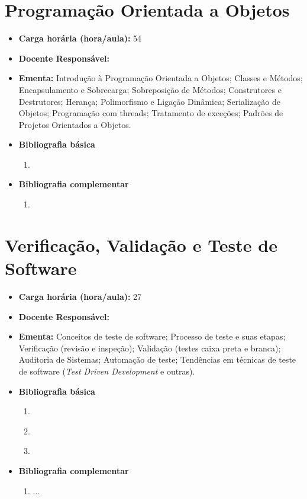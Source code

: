 \documentclass[11pt,fleqn]{book} %
\begin{document}

\newpage
\section{Programação Orientada a Objetos}\label{disc:oriobj}

\begin{itemize}
	\item \textbf{Carga horária (hora/aula):} 54
	\item \textbf{Docente Responsável:}~
	\item \textbf{Ementa:} 
	Introdução à Programação Orientada a Objetos; 
	Classes e Métodos; 
	Encapsulamento e Sobrecarga; 
	Sobreposição de Métodos; 
	Construtores e Destrutores;
	Herança; 
	Polimorfismo e Ligação Dinâmica; 
	Serialização de Objetos; 
	Programação com threads; 
	Tratamento de exceções;
	Padrões de Projetos Orientados a Objetos.
    
	\item \textbf{Bibliografia básica}
	\begin{enumerate}
		\item 
	\end{enumerate}
	\item \textbf{Bibliografia complementar}
	\begin{enumerate}
		\item 	
	\end{enumerate}	
\end{itemize}


\newpage
\section{Verificação, Validação e Teste de Software}\label{disc:testsoft}

\begin{itemize}
	\item \textbf{Carga horária (hora/aula):} 27
	\item \textbf{Docente Responsável:}~
	\item \textbf{Ementa:} 
	Conceitos de teste de software;
	Processo de teste e suas etapas;
	Verificação (revisão e inspeção);
	Validação (testes caixa preta e branca);
	Auditoria de Sistemas;
	Automação de teste;
	Tendências em técnicas de teste de software (\textit{Test Driven Development} e outras).
	
	\item \textbf{Bibliografia básica}
	\begin{enumerate}
		\item ~\cite{pressman2016engenharia}
		\item ~\cite{sommerville2011engenharia}
		\item ~\cite{rios2006teste} 
	\end{enumerate}
	\item \textbf{Bibliografia complementar}
	\begin{enumerate}
		\item ...
	\end{enumerate} 	
\end{itemize}
\end{document}
